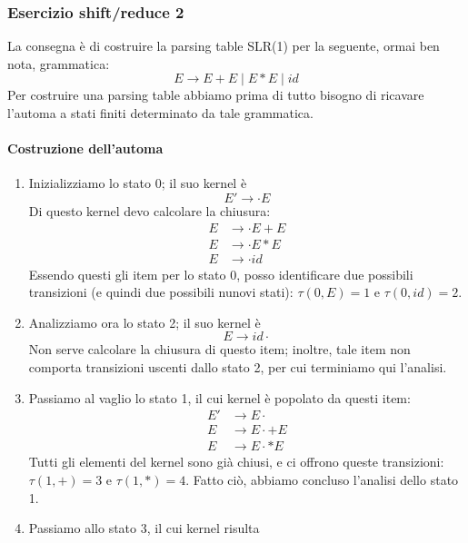 \documentclass[class=book, crop=false, oneside, 12pt]{standalone}
\begin{document}
\subsubsection{Esercizio shift/reduce 2}
La consegna è di costruire la parsing table SLR(1) per la seguente, ormai ben nota, grammatica:
\begin{equation}
    \label{eq:ex2-sh/re-grammar}
    E \to E+E \mid E*E \mid id
\end{equation} 
Per costruire una parsing table abbiamo prima di tutto bisogno di ricavare l'automa a stati finiti determinato da tale grammatica.
\paragraph{Costruzione dell'automa}
\begin{enumerate}
    \item Inizializziamo lo stato 0; il suo kernel è 
    \begin{equation*}
        E' \to \cdot E
    \end{equation*}
    Di questo kernel devo calcolare la chiusura:
    \begin{align*}
        E &\to \cdot E+E \\
        E &\to \cdot E*E \\
        E &\to \cdot id
    \end{align*}
    Essendo questi gli item per lo stato 0, posso identificare due possibili transizioni (e quindi due possibili nunovi stati): \(\tau(0,E)=1 \textrm{ e } \tau(0,id)=2\).
    \item Analizziamo ora lo stato 2; il suo kernel è 
    \begin{equation*}
        E \to id \cdot    
    \end{equation*}
    Non serve calcolare la chiusura di questo item; inoltre, tale item non comporta transizioni uscenti dallo stato 2, per cui terminiamo qui l'analisi.
    \item Passiamo al vaglio lo stato 1, il cui kernel è popolato da questi item:
    \begin{align*}
        E' &\to E \cdot\\
        E  &\to E \cdot +E \\
        E  &\to E \cdot *E
    \end{align*}
    Tutti gli elementi del kernel sono già chiusi, e ci offrono queste transizioni: \(\tau(1,+)=3 \textrm{ e } \tau(1,*)=4\). Fatto ciò, abbiamo concluso l'analisi dello stato 1.
    \item Passiamo allo stato 3, il cui kernel risulta

\end{enumerate}
\end{document}
